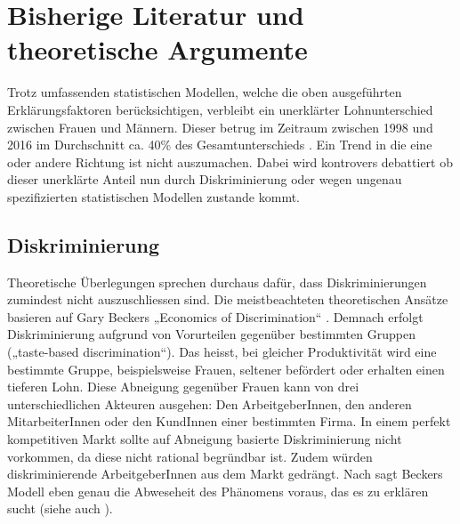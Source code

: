 \documentclass[a4paper,12pt]{article}
\renewcommand{\baselinestretch}{1.1}
\newif\ifcomments
\newcommand{\comment}[1]{%
    \ifcomments\marginpar{\renewcommand{\baselinestretch}{1}\tiny\hspace*{-1.1em}\colorbox{gray!20}%
    {\textcolor{red}{\parbox[t]{.9in}{\raggedright #1}}}}\fi}
\begin{document}
\section{Bisherige Literatur und theoretische Argumente}

Trotz umfassenden statistischen Modellen, welche die oben ausgeführten Erklärungsfaktoren berücksichtigen, verbleibt ein unerklärter Lohnunterschied zwischen Frauen und Männern. Dieser betrug im Zeitraum zwischen 1998 und 2016 im Durchschnitt ca. 40\% des Gesamtunterschieds \citep{BFS-2019a,Strub-2010}. Ein Trend in die eine oder andere Richtung ist nicht auszumachen. Dabei wird kontrovers debattiert ob dieser unerklärte Anteil nun durch Diskriminierung oder wegen ungenau spezifizierten statistischen Modellen zustande kommt.

\subsection{Diskriminierung}
\comment{Abschnitt wurde neu überarbeitet}

Theoretische Überlegungen sprechen durchaus dafür, dass Diskriminierungen zumindest nicht auszuschliessen sind. Die meistbeachteten theoretischen Ansätze basieren auf Gary
Beckers „Economics of Discrimination“ \citep{Becker-1973}. Demnach erfolgt Diskriminierung aufgrund von Vorurteilen gegenüber bestimmten Gruppen („taste-based discrimination“). Das heisst, bei gleicher Produktivität wird eine bestimmte Gruppe, beispielsweise Frauen, seltener befördert oder erhalten einen tieferen Lohn. Diese Abneigung gegenüber Frauen kann von drei unterschiedlichen Akteuren ausgehen: Den ArbeitgeberInnen, den anderen MitarbeiterInnen oder den KundInnen einer bestimmten Firma. In einem perfekt kompetitiven Markt sollte auf Abneigung basierte Diskriminierung nicht vorkommen, da diese nicht rational begründbar ist. Zudem würden diskriminierende ArbeitgeberInnen aus dem Markt gedrängt. Nach \cite{Arrow-1972} sagt Beckers Modell eben genau die Abweseheit des Phänomens voraus, das es zu erklären sucht (siehe auch  \citealp{Guryan-2013}).
\end{document}
